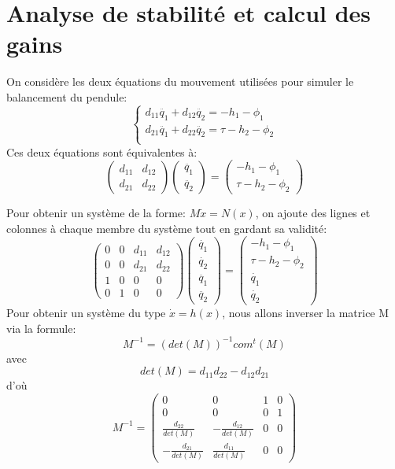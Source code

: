 \documentclass[a4paper,12pt]{report}
\begin{document}
\section*{Analyse de stabilité et calcul des gains}
On considère les deux équations du mouvement utilisées pour simuler le balancement du pendule:
$$
\left\{
    \begin{array}{ll}
        d_{11}\ddot{q_1} + d_{12}\ddot{q_2} = -h_1 - \phi_1  \\
        d_{21}\ddot{q_1} + d_{22}\ddot{q_2} = \tau -h_2 - \phi_2  \\
    \end{array}
\right.
$$
Ces deux équations sont équivalentes à:
$$
    \begin{pmatrix}
    d_{11} & d_{12} \\
    d_{21} & d_{22}
    \end{pmatrix}
    \begin{pmatrix}
    \ddot{q_1} \\
    \ddot{q_2}
    \end{pmatrix}
    =
    \begin{pmatrix}
    -h_1 - \phi_1 \\
    \tau -h_2 - \phi_2
    \end{pmatrix}
$$

Pour obtenir un système de la forme: $M\dot{x}=N(x)$, on ajoute des lignes et colonnes à chaque membre du système tout en gardant sa validité:
$$
    \begin{pmatrix}
    0 & 0 & d_{11} & d_{12} \\
    0 & 0 & d_{21} & d_{22} \\
    1 & 0 & 0 & 0 \\
    0 & 1 & 0 & 0
    \end{pmatrix}
    \begin{pmatrix}
    \dot{q_1} \\
    \dot{q_2} \\
    \ddot{q_1} \\
    \ddot{q_2}
    \end{pmatrix}
    =
    \begin{pmatrix}
    -h_1 - \phi_1 \\
    \tau -h_2 - \phi_2 \\
    \dot{q_1} \\
    \dot{q_2}
    \end{pmatrix}
$$
Pour obtenir un système du type $ \dot{x} = h(x) $, nous allons inverser la matrice M via la formule:
$$ M^{-1} = (det(M))^{-1} com^t (M) $$
avec $$ det(M) = d_{11}d_{22} - d_{12}d_{21} $$
d'où
$$
    M^{-1}
    =
    \begin{pmatrix}
    0 & 0 & 1 & 0 \\
    0 & 0 & 0 & 1 \\
    \frac{d_{22}}{det(M)} & -\frac{d_{12}}{det(M)} & 0 & 0 \\
    -\frac{d_{21}}{det(M)} & \frac{d_{11}}{det(M)} & 0 & 0
    \end{pmatrix}
$$
\end{document}
